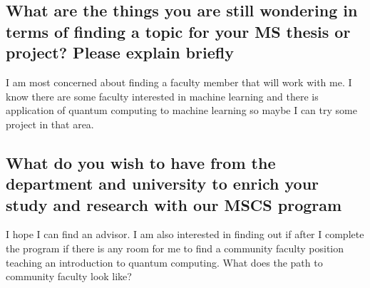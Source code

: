 \documentclass{article}
\begin{document}
\subsection{What are the things you are still wondering in terms of finding a topic for your MS thesis or project? Please explain briefly}
I am most concerned about finding a faculty member that will work with me. I know there are some faculty interested in machine learning and there is application of quantum computing to machine learning so maybe I can try some project in that area.

\subsection{What do you wish to have from the department and university to enrich your study and research with our MSCS program}
I hope I can find an advisor. I am also interested in finding out if after I complete the program if there is any room for me to find a community faculty position teaching an introduction to quantum computing. What does the path to community faculty look like?
\end{document}
